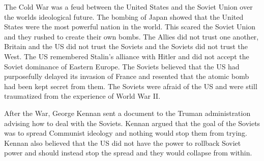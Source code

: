 The Cold War was a feud between the United States and the Soviet Union over the worlds ideological future.
The bombing of Japan showed that the United States were the most powerful nation in the world.
This scared the Soviet Union and they rushed to create their own bombs.
The Allies did not trust one another, Britain and the US did not trust the Soviets and the Soviets did not trust the West.
The US remembered Stalin's alliance with Hitler and did not accept the Soviet dominance of Eastern Europe.
The Soviets believed that the US had purposefully delayed its invasion of France and resented that the atomic bomb had been kept secret from them.
The Soviets were afraid of the US and were still traumatized from the experience of World War II.

After the War, George Kennan sent a document to the Truman administration advising how to deal with the Soviets.
Kennan argued that the goal of the Soviets was to spread Communist ideology and nothing would stop them from trying.
Kennan also believed that the US did not have the power to rollback Soviet power and should instead stop the spread and they would collapse from within.